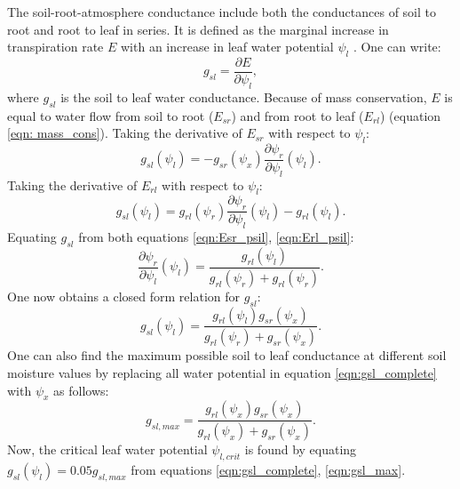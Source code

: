 \documentclass[utf8]{frontiersSCNS} %
\begin{document}
The soil-root-atmosphere conductance include both the conductances of soil to root and root to leaf in series. It is defined as the marginal increase in transpiration rate $E$ with an increase in leaf water potential $\psi_l$ \citep{sperry_what_2015}. One can write:
\begin{equation}
    \label{eqn:g_sl}
    g_{sl} = \frac{\partial E}{\partial \psi_l},
\end{equation}
where $g_{sl}$ is the soil to leaf water conductance. Because of mass conservation, $E$ is equal to water flow from soil to root ($E_{sr}$) and from root to leaf ($E_{rl}$) (equation \ref{eqn: mass_cons}).
Taking the derivative of $E_{sr}$ with respect to $\psi_l$:
\begin{equation}
    \label{eqn:Esr_psil}
    g_{sl} (\psi_l) = - g_{sr} (\psi_x) \frac{\partial \psi_r}{\partial \psi_l} (\psi_l).
\end{equation}
Taking the derivative of $E_{rl}$ with respect to $\psi_l$:
\begin{equation}
    \label{eqn:Erl_psil}
    g_{sl} (\psi_l) = g_{rl} (\psi_r) \frac{\partial \psi_r}{\partial \psi_l} (\psi_l) - g_{rl} (\psi_l).
\end{equation}
Equating $g_{sl}$ from both equations \ref{eqn:Esr_psil}, \ref{eqn:Erl_psil}:
\begin{equation}
    \label{eqn:psir_psil}
    \frac{\partial \psi_r}{\partial \psi_l} (\psi_l) = \frac{g_{rl} (\psi_l)}{g_{rl} (\psi_r) + g_{rl} (\psi_r)}.
\end{equation}
One now obtains a closed form relation for $g_{sl}$:
\begin{equation}
    \label{eqn:gsl_complete}
    g_{sl} (\psi_l) = \frac{g_{rl} (\psi_l) g_{sr} (\psi_x)}{g_{rl} (\psi_r) + g_{sr} (\psi_x)}.
\end{equation}
One can also find the maximum possible soil to leaf conductance at different soil moisture values by replacing all water potential in equation \ref{eqn:gsl_complete} with $\psi_x$ as follows:
\begin{equation}
    \label{eqn:gsl_max}
    g_{sl,max} = \frac{g_{rl} (\psi_x) g_{sr} (\psi_x)}{g_{rl} (\psi_x) + g_{sr} (\psi_x)}.
\end{equation}
Now, the critical leaf water potential $\psi_{l,crit}$ is found by equating $g_{sl}(\psi_l) = 0.05 g_{sl,max}$ from equations \ref{eqn:gsl_complete}, \ref{eqn:gsl_max}.
\end{document}
